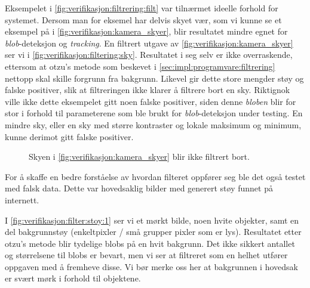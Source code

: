 
Eksempelet i \autoref{fig:verifikasjon:filtrering:filt} var tilnærmet ideelle forhold for systemet.
Dersom man for eksemel har delvis skyet vær, som vi kunne se et eksempel på i \autoref{fig:verifikasjon:kamera_skyer}, blir resultatet mindre egnet for \textit{blob}-deteksjon og \textit{tracking}.
En filtrert utgave av \autoref{fig:verifikasjon:kamera_skyer} ser vi i \autoref{fig:verifikasjon:filtering:sky}.
Resultatet i seg selv er ikke overraskende, ettersom at otzu's metode som beskevet i \autoref{sec:impl:programvare:filtrering} nettopp skal skille forgrunn fra bakgrunn.
Likevel gir dette store mengder støy og falske positiver, slik at filtreringen ikke klarer å filtrere bort en sky.
Riktignok ville ikke dette eksempelet gitt noen falske positiver, siden denne \textit{bloben} blir for stor i forhold til parameterene som ble brukt for \textit{blob}-deteksjon under testing. 
En mindre sky, eller en sky med større kontraster og lokale maksimum og minimum, kunne derimot gitt falske positiver.


\begin{figure}[H]
    \centering
    \caption{Skyen i \autoref{fig:verifikasjon:kamera_skyer} blir ikke filtrert bort.}
    \label{fig:verifikasjon:filtering:sky}
\end{figure}

For å skaffe en bedre forståelse av hvordan filteret oppfører seg ble det også testet med falsk data. 
Dette var hovedsaklig bilder med generert støy funnet på internett. 

I \autoref{fig:verifikasjon:filter:stoy:1} ser vi et mørkt bilde, noen hvite objekter, samt en del bakgrunnstøy (enkeltpixler / små grupper pixler som er lys). 
Resultatet etter otzu's metode blir tydelige blobs på en hvit bakgrunn. 
Det ikke sikkert antallet og størrelsene til blobs er bevart, men vi ser at filtreret som en helhet utfører oppgaven med å fremheve disse.
Vi bør merke oss her at bakgrunnen i hovedsak er svært mørk i forhold til objektene.

